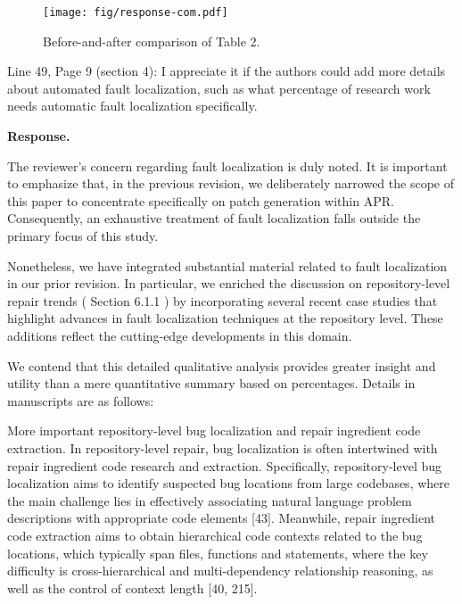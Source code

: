 \documentclass[acmsmall]{acmart}
\begin{document}
	\begin{figure}[t!]
		\centering
		\texttt{[image: fig/response-com.pdf]}
		\caption{Before-and-after comparison of Table 2.}
		\label{f:t2}
	\end{figure}

	\begin{tcolorbox}
		[commentbox,title=Reviewer \#2 - Comment 5] Line 49, Page 9 (section 4): I appreciate it if
		the authors could add more details about automated fault localization, such as what percentage
		of research work needs automatic fault localization specifically.
	\end{tcolorbox}


	\noindent
	\textbf{Response.}

	The reviewer’s concern regarding fault localization is duly noted. It is important to emphasize that,
	in the previous revision, we deliberately narrowed the scope of this paper to concentrate specifically
	on patch generation within APR. Consequently, an exhaustive treatment of fault localization falls
	outside the primary focus of this study.

	Nonetheless, we have integrated substantial material related to fault localization in our prior
	revision. In particular, we enriched the discussion on repository-level repair trends (
	\color{red}
	Section 6.1.1
	\color{black}
	) by incorporating several recent case studies that highlight advances in fault localization techniques
	at the repository level. These additions reflect the cutting-edge developments in this domain.

	We contend that this detailed qualitative analysis provides greater insight and utility than a
	mere quantitative summary based on percentages. Details in manuscripts are as follows:

	\color{blue}
	More important repository-level bug localization and repair ingredient code extraction. In
	repository-level repair, bug localization is often intertwined with repair ingredient code research
	and extraction. Specifically, repository-level bug localization aims to identify suspected bug locations
	from large codebases, where the main challenge lies in effectively associating natural language
	problem descriptions with appropriate code elements [43]. Meanwhile, repair ingredient code
	extraction aims to obtain hierarchical code contexts related to the bug locations, which typically
	span files, functions and statements, where the key difficulty is cross-hierarchical and multi-dependency
	relationship reasoning, as well as the control of context length [40, 215].
\end{document}
